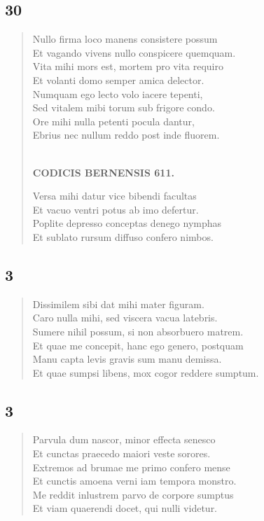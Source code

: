 \documentclass[11pt, a4paper]{report}
\begin{document}
            \subsection*{30}
      \begin{verse}
      Nullo firma loco manens consistere possum \\ Et vagando vivens nullo conspicere quemquam. \\ Vita mihi mors est, mortem pro vita requiro \\ Et volanti domo semper amica delector. \\ Numquam ego lecto volo iacere tepenti, \\ Sed vitalem mibi torum sub frigore condo. \\ Ore mihi nulla petenti pocula dantur, \\ Ebrius nec nullum reddo post inde fluorem. \\ 
        ﻿\pagebreak 
    \begin{center} \textbf{CODICIS BERNENSIS 611.} \end{center} \marginpar{[361]} Versa mihi datur vice bibendi facultas \\ Et vacuo ventri potus ab imo defertur. \\ Poplite depresso conceptas denego nymphas \\ Et sublato rursum diffuso confero nimbos. \\ 
      \end{verse}
  
            \subsection*{3}
      \begin{verse}
      Dissimilem sibi dat mihi mater figuram. \\ Caro nulla mihi, sed viscera vacua latebris. \\ Sumere nihil possum, si non absorbuero matrem. \\ Et quae me concepit, hanc ego genero, postquam \\ Manu capta levis gravis sum manu demissa. \\ Et quae sumpsi libens, mox cogor reddere sumptum. \\ 
      \end{verse}
  
            \subsection*{3}
      \begin{verse}
      Parvula dum nascor, minor effecta senesco \\ Et cunctas praecedo maiori veste sorores. \\ Extremos ad brumae me primo confero mense \\ Et cunctis amoena verni iam tempora monstro. \\ Me reddit inlustrem parvo de corpore sumptus \\ Et viam quaerendi docet, qui nulli videtur. \\ 
      \end{verse}
  
\end{document}
